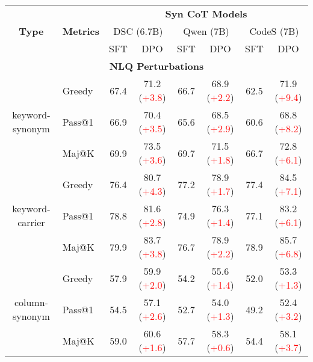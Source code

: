 \begin{table*}[t!]
    \centering
\begin{adjustbox}{max width=\textwidth}
    \begin{tabular}{c | l | c c | c c | c c }
        \toprule
         \multirow{3}{*}{\textbf{Type}} & \multirow{3}{*}{\textbf{Metrics}} & \multicolumn{6}{c}{\textbf{Syn CoT Models}} \\ \cline{3-8}
         & & \multicolumn{2}{c}{DSC (6.7B)} & \multicolumn{2}{c}{Qwen (7B)} & \multicolumn{2}{c}{CodeS (7B)} \\ \cline{3-8}
         & & SFT & DPO & SFT & DPO & SFT & DPO \\ \midrule
        \multicolumn{8}{c}{\textbf{NLQ Perturbations}} \\ \midrule

        \multirow{3}{*}{keyword-synonym} & Greedy & 67.4 & 71.2 (\textcolor{red}{+3.8}) & 66.7 & 68.9 (\textcolor{red}{+2.2}) & 62.5 & 71.9 (\textcolor{red}{+9.4}) \\
        & Pass@1 & 66.9 & 70.4 (\textcolor{red}{+3.5}) & 65.6 & 68.5 (\textcolor{red}{+2.9}) & 60.6 & 68.8 (\textcolor{red}{+8.2}) \\
        & Maj@K & 69.9 & 73.5 (\textcolor{red}{+3.6}) & 69.7 & 71.5 (\textcolor{red}{+1.8}) & 66.7 & 72.8 (\textcolor{red}{+6.1}) \\ \midrule

        \multirow{3}{*}{keyword-carrier} & Greedy & 76.4 & 80.7 (\textcolor{red}{+4.3}) & 77.2 & 78.9 (\textcolor{red}{+1.7}) & 77.4 & 84.5 (\textcolor{red}{+7.1}) \\
        & Pass@1 & 78.8 & 81.6 (\textcolor{red}{+2.8}) & 74.9 & 76.3 (\textcolor{red}{+1.4}) & 77.1 & 83.2 (\textcolor{red}{+6.1}) \\
        & Maj@K & 79.9 & 83.7 (\textcolor{red}{+3.8}) & 76.7 & 78.9 (\textcolor{red}{+2.2}) & 78.9 & 85.7 (\textcolor{red}{+6.8}) \\ \midrule

        \multirow{3}{*}{column-synonym} & Greedy & 57.9	& 59.9	(\textcolor{red}{+2.0})& 54.2	&55.6 (\textcolor{red}{+1.4})&52.0	&53.3 (\textcolor{red}{+1.3})\\     
        & Pass@1 & 54.5	&57.1 (\textcolor{red}{+2.6})	&52.7	&54.0 (\textcolor{red}{+1.3})	&49.2	&52.4 (\textcolor{red}{+3.2}) \\
        & Maj@K& 59.0	&60.6 (\textcolor{red}{+1.6})	&57.7	&58.3 (\textcolor{red}{+0.6})	&54.4	&58.1 (\textcolor{red}{+3.7}) \\ \midrule


\end{tabular}
\end{adjustbox}
\end{table*}

